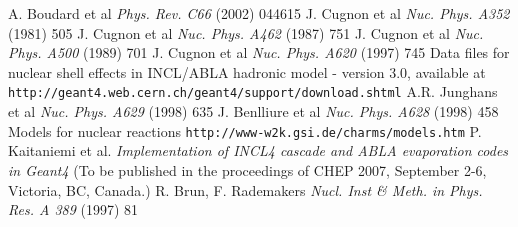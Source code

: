 \begin{thebibliography}{99}



 A. Boudard et al \emph{Phys. Rev. C66} (2002) 044615
 J. Cugnon et al \emph{Nuc. Phys. A352} (1981) 505
 J. Cugnon et al \emph{Nuc. Phys. A462} (1987) 751
 J. Cugnon et al \emph{Nuc. Phys. A500} (1989) 701
 J. Cugnon et al \emph{Nuc. Phys. A620} (1997) 745
 Data files for nuclear shell effects in INCL/ABLA hadronic
  model - version 3.0, available at {\tt
    http://geant4.web.cern.ch/geant4/support/download.shtml}
 A.R. Junghans et al \emph{Nuc. Phys. A629} (1998) 635
 J. Benlliure et al \emph{Nuc. Phys. A628} (1998) 458
 Models for nuclear reactions {\tt http://www-w2k.gsi.de/charms/models.htm}
 P. Kaitaniemi et al. \emph{Implementation of
    INCL4 cascade and ABLA evaporation codes in Geant4} (To be
    published in the proceedings of CHEP 2007, September 2-6,
    Victoria, BC, Canada.)
 R. Brun, F. Rademakers \emph{Nucl. Inst \&
    Meth. in Phys. Res. A 389} (1997) 81
\end{thebibliography}
